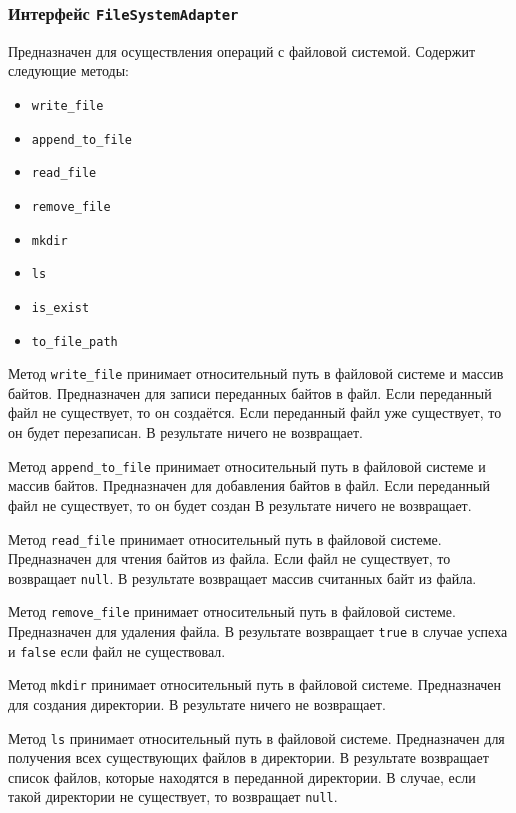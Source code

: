 \subsubsection{Интерфейс \texttt{FileSystemAdapter}}
Предназначен для осуществления операций с файловой системой.
Содержит следующие методы:
\begin{itemize}
    \item \texttt{write\_file}
    \item \texttt{append\_to\_file}
    \item \texttt{read\_file}
    \item \texttt{remove\_file}
    \item \texttt{mkdir}
    \item \texttt{ls}
    \item \texttt{is\_exist}
    \item \texttt{to\_file\_path}
\end{itemize}

Метод \texttt{write\_file} принимает относительный путь в файловой системе и массив байтов.
Предназначен для записи переданных байтов в файл.
Если переданный файл не существует, то он создаётся.
Если переданный файл уже существует, то он будет перезаписан.
В результате ничего не возвращает.

Метод \texttt{append\_to\_file} принимает относительный путь в файловой системе и массив байтов.
Предназначен для добавления байтов в файл.
Если переданный файл не существует, то он будет создан
В результате ничего не возвращает.

Метод \texttt{read\_file} принимает относительный путь в файловой системе.
Предназначен для чтения байтов из файла.
Если файл не существует, то возвращает \texttt{null}.
В результате возвращает массив считанных байт из файла.

Метод \texttt{remove\_file} принимает относительный путь в файловой системе.
Предназначен для удаления файла.
В результате возвращает \texttt{true} в случае успеха и \texttt{false} если файл не существовал.

Метод \texttt{mkdir} принимает относительный путь в файловой системе.
Предназначен для создания директории. 
В результате ничего не возвращает.

Метод \texttt{ls} принимает относительный путь в файловой системе.
Предназначен для получения всех существующих файлов в директории.
В результате возвращает список файлов, которые находятся в переданной директории.
В случае, если такой директории не существует, то возвращает \texttt{null}.

